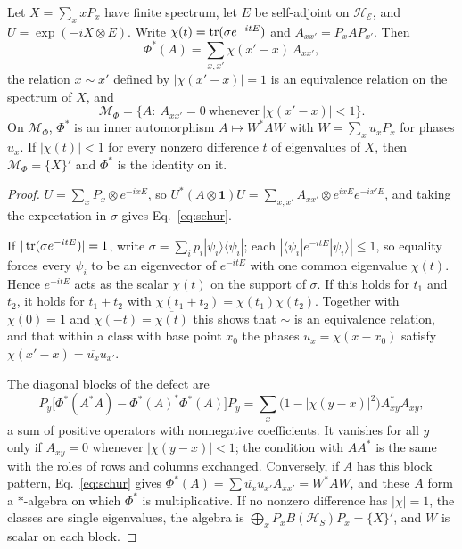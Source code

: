 \begin{theorem}
\label{thm:md}
Let $X=\sum_xxP_x$ have finite spectrum, let $E$ be self-adjoint on $\mathcal H_{\mathcal E}$, and $U=\exp(-iX\otimes E)$. Write $\chi(t)=\operatorname{tr}(\sigma e^{-itE})$ and $A_{xx'}=P_xAP_{x'}$. Then
\begin{equation}
\Phi^*(A)=\sum_{x,x'}\chi(x'-x)\,A_{xx'} ,
\label{eq:schur}
\end{equation}
the relation $x\sim x'$ defined by $|\chi(x'-x)|=1$ is an equivalence relation on the spectrum of $X$, and
\begin{equation}
\mathcal M_\Phi=\{A:\ A_{xx'}=0\ \text{whenever}\ |\chi(x'-x)|<1\}.
\end{equation}
On $\mathcal M_\Phi$, $\Phi^*$ is an inner automorphism $A\mapsto W^*AW$ with $W=\sum_xu_xP_x$ for phases $u_x$. If $|\chi(t)|<1$ for every nonzero difference $t$ of eigenvalues of $X$, then $\mathcal M_\Phi=\{X\}'$ and $\Phi^*$ is the identity on it.
\end{theorem}

\begin{proof}
$U=\sum_xP_x\otimes e^{-ixE}$, so $U^*(A\otimes\mathbf 1)U=\sum_{x,x'}A_{xx'}\otimes e^{ixE}e^{-ix'E}$, and taking the expectation in $\sigma$ gives Eq.~\eqref{eq:schur}.

If $|\operatorname{tr}(\sigma e^{-itE})|=1$, write $\sigma=\sum_ip_i|\psi_i\rangle\langle\psi_i|$; each $|\langle\psi_i|e^{-itE}|\psi_i\rangle|\le1$, so equality forces every $\psi_i$ to be an eigenvector of $e^{-itE}$ with one common eigenvalue $\chi(t)$. Hence $e^{-itE}$ acts as the scalar $\chi(t)$ on the support of $\sigma$. If this holds for $t_1$ and $t_2$, it holds for $t_1+t_2$ with $\chi(t_1+t_2)=\chi(t_1)\chi(t_2)$. Together with $\chi(0)=1$ and $\chi(-t)=\overline{\chi(t)}$ this shows that $\sim$ is an equivalence relation, and that within a class with base point $x_0$ the phases $u_x=\chi(x-x_0)$ satisfy $\chi(x'-x)=\overline{u_x}u_{x'}$.

The diagonal blocks of the defect are
\begin{equation}
P_y\bigl[\Phi^*(A^*A)-\Phi^*(A)^*\Phi^*(A)\bigr]P_y=\sum_x\bigl(1-|\chi(y-x)|^2\bigr)A_{xy}^*A_{xy},
\end{equation}
a sum of positive operators with nonnegative coefficients. It vanishes for all $y$ only if $A_{xy}=0$ whenever $|\chi(y-x)|<1$; the condition with $AA^*$ is the same with the roles of rows and columns exchanged. Conversely, if $A$ has this block pattern, Eq.~\eqref{eq:schur} gives $\Phi^*(A)=\sum\overline{u_x}u_{x'}A_{xx'}=W^*AW$, and these $A$ form a $*$-algebra on which $\Phi^*$ is multiplicative. If no nonzero difference has $|\chi|=1$, the classes are single eigenvalues, the algebra is $\bigoplus_xP_xB(\mathcal H_S)P_x=\{X\}'$, and $W$ is scalar on each block.
\end{proof}

